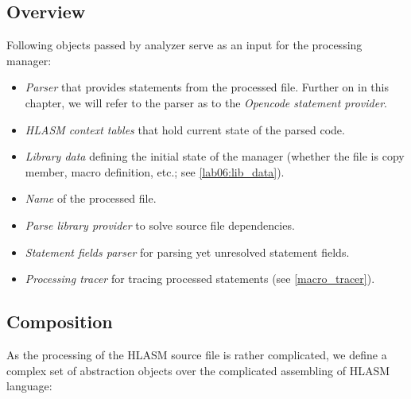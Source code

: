 \subsection{Overview}

Following objects passed by analyzer serve as an input for the processing manager:
\begin{itemize}
	\item \emph{Parser} that provides statements from the processed file. Further on in this chapter, we will refer to the parser as to the \emph{Opencode statement provider}.
	\item \emph{HLASM context tables} that hold current state of the parsed code.
	\item \emph{Library data} defining the initial state of the manager (whether the file is copy member, macro definition, etc.; see \cref{lab06:lib_data}). 
	\item \emph{Name} of the processed file.
	\item \emph{Parse library provider} to solve source file dependencies.
	\item \emph{Statement fields parser} for parsing yet unresolved statement fields. 
	\item \emph{Processing tracer} for tracing processed statements (see \cref{macro_tracer}).
\end{itemize}


\subsection{Composition}

As the processing of the HLASM source file is rather complicated, we define a complex set of abstraction objects over the complicated assembling of HLASM language:

